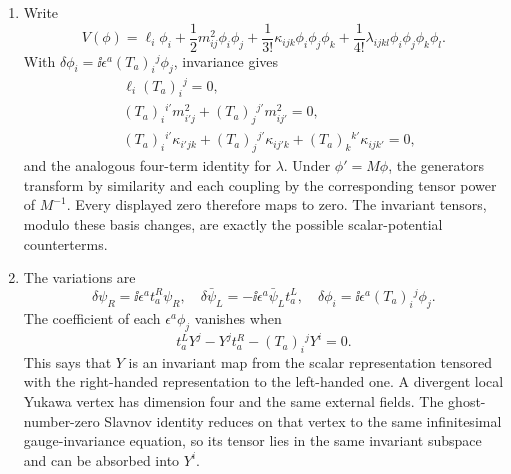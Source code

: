 \begin{enumerate}
  \begin{enumerate}
    \item[(a)]
    Write
    \[
      V(\phi)=\ell_i\phi_i+\frac12m^2_{ij}\phi_i\phi_j
        +\frac1{3!}\kappa_{ijk}\phi_i\phi_j\phi_k
        +\frac1{4!}\lambda_{ijkl}\phi_i\phi_j\phi_k\phi_l .
    \]
    With \(\delta\phi_i=\ii\epsilon^a
    (T_a)_i{}^j\phi_j\), invariance gives
    \[
    \begin{aligned}
      &\ell_i(T_a)_i{}^j=0,\\
      &(T_a)_i{}^{i'}m^2_{i'j}
        +(T_a)_j{}^{j'}m^2_{ij'}=0,\\
      &(T_a)_i{}^{i'}\kappa_{i'jk}
        +(T_a)_j{}^{j'}\kappa_{ij'k}
        +(T_a)_k{}^{k'}\kappa_{ijk'}=0,
    \end{aligned}
    \]
    and the analogous four-term identity for \(\lambda\).  Under
    \(\phi'=M\phi\), the generators transform by similarity and each
    coupling by the corresponding tensor power of \(M^{-1}\).  Every
    displayed zero therefore maps to zero.  The invariant tensors, modulo
    these basis changes, are exactly the possible scalar-potential
    counterterms.
    \item[(b)]
    The variations are
    \[
      \delta\psi_R=\ii\epsilon^a t_a^R\psi_R,\quad
      \delta\bar\psi_L=-\ii\epsilon^a\bar\psi_Lt_a^L,\quad
      \delta\phi_i=\ii\epsilon^a(T_a)_i{}^j\phi_j .
    \]
    The coefficient of each \(\epsilon^a\phi_j\) vanishes when
    \[
      \boxed{
      t_a^LY^j-Y^jt_a^R
        -(T_a)_i{}^jY^i=0.}
    \]
    This says that \(Y\) is an invariant map from the scalar representation
    tensored with the right-handed representation to the left-handed one.
    A divergent local Yukawa vertex has dimension four and the same
    external fields.  The ghost-number-zero Slavnov identity reduces on
    that vertex to the same infinitesimal gauge-invariance equation, so its
    tensor lies in the same invariant subspace and can be absorbed into
    \(Y^i\).
  \end{enumerate}


\end{enumerate}
